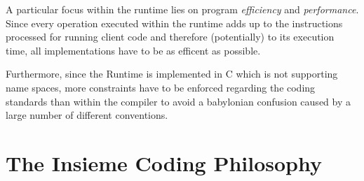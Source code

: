 A particular focus within the runtime lies on program \textit{efficiency} and
\textit{performance}. Since every operation executed within the runtime adds up
to the instructions processed for running client code and therefore
(potentially) to its execution time, all implementations have to be as efficent
as possible.

Furthermore, since the Runtime is implemented in C which is not supporting name
spaces, more constraints have to be enforced regarding the coding standards than
within the compiler to avoid a babylonian confusion caused by a large number of
different conventions.


\section{The Insieme Coding Philosophy}

\begin{comment}
\begin{itemize}
  \item Insieme Compiler vs. Insieme Runtime
  \item Compiler - tool kit to build compiler related utilities,
  transformations, analysis, \ldots
  \item Runtime - framework controlling the execution of an application;
  extended by providing alternative implementations of given functionality; flow
  of control is dictated by the runtime
  \item Point out difference: Compiler = Library = Toolkit, Runtime = Framework
\end{itemize}


State that:
\begin{itemize}
  \item Each ``component'' should represent a closed entity - usable via a simple
  user friendly interface without the requirement of modifying internal code
  \item Each component has to declare itself as a ``framework'' or ``library'' -
  define those two terms!
  \item Extendable by design - not re-design
  \item Coding standards
\end{itemize}
\end{comment}
